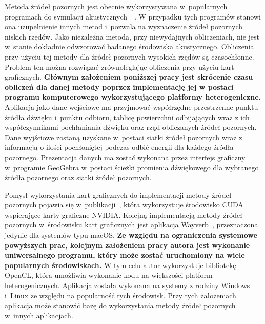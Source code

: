 Metoda źródeł pozornych jest obecnie wykorzystywana w~popularnych programach do symulacji akustycznych~\cite{b7}~\cite{b8}. W przypadku tych programów stanowi ona uzupełnienie innych metod i~pozwala na wyznaczenie źródeł pozornych niskich rzędów. Jako niezależna metoda, przy niewydajnych obliczeniach, nie jest w~stanie dokładnie odwzorować badanego środowiska akustycznego. Obliczenia przy użyciu tej metody dla źródeł pozornych wysokich rzędów są czasochłonne. Problem ten można rozwiązać zrównoleglając obliczenia przy użyciu kart graficznych. \textbf{Głównym założeniem poniższej pracy jest skrócenie czasu obliczeń dla danej metody poprzez implementację jej w postaci programu komputerowego wykorzystującego platformy heterogeniczne.} Aplikacja jako dane wejściowe ma przyjmować współrzędne przestrzenne punktu źródła dźwięku i~punktu odbioru, tablicę powierzchni odbijających wraz z ich współczynnikami pochłaniania dźwięku oraz rząd obliczanych źródeł pozornych. Dane wyjściowe zostaną uzyskane w~postaci siatki źródeł pozornych wraz z informacją o ilości pochłoniętej podczas odbić energii dla każdego źródła pozornego. Prezentacja danych ma zostać wykonana przez interfejs graficzny w~programie GeoGebra w~postaci ścieżki promienia dźwiękowego dla wybranego źródła pozornego oraz siatki źródeł pozornych.

Pomysł  wykorzystania kart graficznych do implementacji metody źródeł pozornych pojawia się w~publikacji~\cite{b9}, która wykorzystuje środowisko CUDA wspierające karty graficzne NVIDIA. Kolejną implementacją metody źródeł pozornych w~środowisku kart graficznych jest aplikacja Wayverb~\cite{b10}, przeznaczona jedynie dla systemów typu macOS. \textbf{Ze względu na ograniczenia systemowe powyższych prac, kolejnym założeniem pracy autora jest wykonanie uniwersalnego programu, który może zostać uruchomiony na wiele popularnych środowiskach.} W tym celu autor wykorzystuje bibliotekę OpenCL, która umożliwia wykonanie kodu na większości platform heterogenicznych. Aplikacja została wykonana na systemy z rodziny Windows i~Linux ze względu na popularność tych środowisk. Przy tych założeniach aplikacja może stanowić bazę do wykorzystania metody źródeł pozornych w~innych aplikacjach.



















